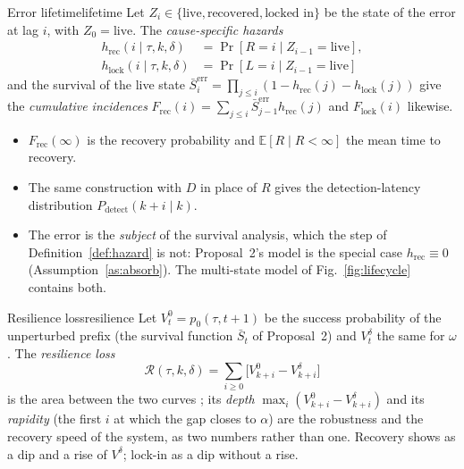 \begin{definition}{Error lifetime}{lifetime}
Let $Z_i\in\{\text{live},\text{recovered},\text{locked in}\}$ be the state of the error at lag $i$, with $Z_0=\text{live}$. The \emph{cause-specific hazards}
\begin{align*}
h_{\mathrm{rec}}(i\mid\tau,k,\delta)&=\Pr[R{=}i\mid Z_{i-1}{=}\text{live}],\\
h_{\mathrm{lock}}(i\mid\tau,k,\delta)&=\Pr[L{=}i\mid Z_{i-1}{=}\text{live}]
\end{align*}
and the survival of the live state $\bar S^{\mathrm{err}}_i=\prod_{j\le i}(1-h_{\mathrm{rec}}(j)-h_{\mathrm{lock}}(j))$ give the \emph{cumulative incidences} $F_{\mathrm{rec}}(i)=\sum_{j\le i}\bar S^{\mathrm{err}}_{j-1}h_{\mathrm{rec}}(j)$ and $F_{\mathrm{lock}}(i)$ likewise.
\begin{itemize}[leftmargin=1.1em]
\item $F_{\mathrm{rec}}(\infty)$ is the recovery probability and $\mathbb{E}[R\mid R<\infty]$ the mean time to recovery.
\item The same construction with $D$ in place of $R$ gives the detection-latency distribution $P_{\mathrm{detect}}(k{+}i\mid k)$.
\item The error is the \emph{subject} of the survival analysis, which the step of Definition~\ref{def:hazard} is not: Proposal~2's model is the special case $h_{\mathrm{rec}}\equiv0$ (Assumption~\ref{as:absorb}). The multi-state model of Fig.~\ref{fig:lifecycle} contains both.
\end{itemize}
\end{definition}

\begin{definition}{Resilience loss}{resilience}
Let $V^0_t=p_0(\tau,t{+}1)$ be the success probability of the unperturbed prefix (the survival function $\bar S_t$ of Proposal~2) and $V^\delta_t$ the same for $\omega$. The \emph{resilience loss}
\[\mathcal{R}(\tau,k,\delta)=\sum_{i\ge0}\big[V^0_{k+i}-V^\delta_{k+i}\big]\]
is the area between the two curves \cite{bruneau2003resilience}; its \emph{depth} $\max_i(V^0_{k+i}-V^\delta_{k+i})$ and its \emph{rapidity} (the first $i$ at which the gap closes to $\alpha$) are the robustness and the recovery speed of the system, as two numbers rather than one. Recovery shows as a dip and a rise of $V^\delta$; lock-in as a dip without a rise.
\end{definition}

